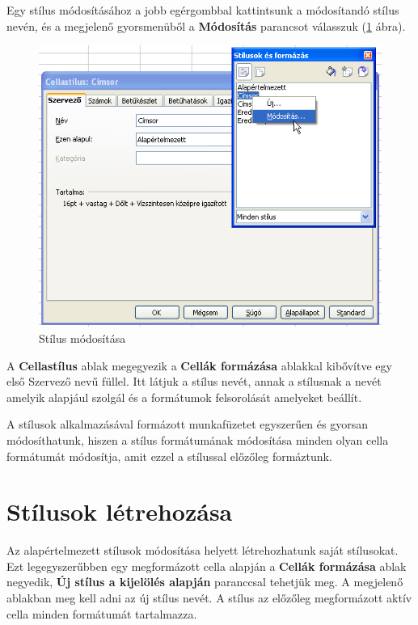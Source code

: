 Egy stílus módosításához a jobb egérgombbal kattintsunk a
módosítandó stílus nevén, és a megjelenő
gyorsmenüből a \textbf{Módosítás} parancsot válasszuk
(\ref{StílusMódosítása} ábra).

\begin{figure}[!h]
\begin{center}
\includegraphics[width=14.208cm]{oocalcv2-img158.png}
\caption{Stílus módosítása}\label{StílusMódosítása}
\end{center}
\end{figure}

A \textbf{Cellastílus} ablak megegyezik a \textbf{Cellák
formázása} ablakkal kibővítve egy első Szervező
nevű füllel. Itt látjuk a stílus nevét, annak a stílusnak
a nevét amelyik alapjául szolgál és a formátumok
felsorolását amelyeket beállít.

A stílusok alkalmazásával formázott munkafüzetet
egyszerűen és gyorsan módosíthatunk, hiszen a stílus
formátumának módosítása minden olyan cella formátumát
módosítja, amit ezzel a stílussal előzőleg formáztunk.


\section{Stílusok létrehozása}

Az alapértelmezett stílusok módosítása helyett
létrehozhatunk saját stílusokat. Ezt legegyszerűbben egy
megformázott cella alapján a \textbf{Cellák formázása} ablak
negyedik, \textbf{Új stílus a kijelölés alapján} paranccsal
tehetjük meg. A megjelenő ablakban meg kell adni az új stílus
nevét. A stílus az előzőleg megformázott aktív cella
minden formátumát tartalmazza.

